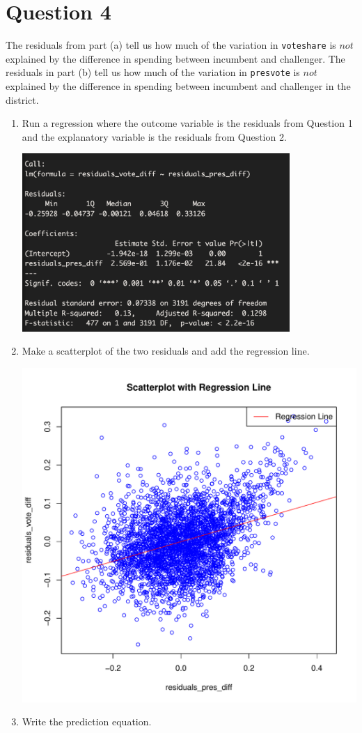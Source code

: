 \documentclass[12pt,letterpaper]{article}
\begin{document}
\newpage	
\section*{Question 4}
\noindent The residuals from part (a) tell us how much of the variation in \texttt{voteshare} is $not$ explained by the difference in spending between incumbent and challenger. The residuals in part (b) tell us how much of the variation in \texttt{presvote} is $not$ explained by the difference in spending between incumbent and challenger in the district.
	\begin{enumerate}
		\item Run a regression where the outcome variable is the residuals from Question 1 and the explanatory variable is the residuals from Question 2.	
		 
		\includegraphics[width=0.8\textwidth]{q4.png}
		\vspace{6cm}
		\item Make a scatterplot of the two residuals and add the regression line. 	
		 
		\includegraphics[width=.85\textwidth]{lm_residuals.pdf}
		\vspace{6cm}
		\item Write the prediction equation.
		 
	\end{enumerate}
	
\end{document}
